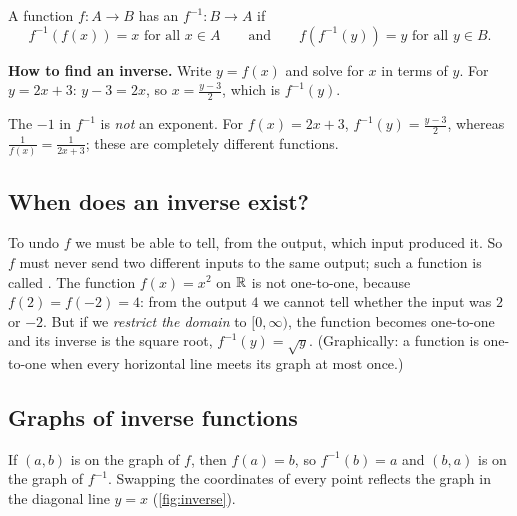 \begin{definition}\label{def:inverse-function}
A function $f\colon A \to B$ has an 
$f^{-1}\colon B \to A$ if
\[
  f^{-1}(f(x)) = x \text{ for all } x \in A
  \qquad\text{and}\qquad
  f(f^{-1}(y)) = y \text{ for all } y \in B .
\]
\end{definition}

\textbf{How to find an inverse.} Write $y = f(x)$ and solve for $x$ in terms of
$y$. For $y = 2x + 3$: $y - 3 = 2x$, so $x = \frac{y-3}{2}$, which is
$f^{-1}(y)$.

\begin{pitfall}[$f^{-1}$ is not $1/f$]
The $-1$ in $f^{-1}$ is \emph{not} an exponent. For $f(x) = 2x + 3$,
$f^{-1}(y) = \frac{y-3}{2}$, whereas $\frac{1}{f(x)} = \frac{1}{2x+3}$; these
are completely different functions.
\end{pitfall}

\subsection{When does an inverse exist?}

To undo $f$ we must be able to tell, from the output, which input produced
it. So $f$ must never send two different inputs to the same output; such a
function is called . The function $f(x) = x^2$ on $\mathbb{R}$ is not
one-to-one, because $f(2) = f(-2) = 4$: from the output $4$ we cannot tell
whether the input was $2$ or $-2$. But if we \emph{restrict the domain} to
$[0, \infty)$, the function becomes one-to-one and its inverse is the square
root, $f^{-1}(y) = \sqrt{y}$. (Graphically: a function is one-to-one when every
horizontal line meets its graph at most once.)

\subsection{Graphs of inverse functions}

If $(a, b)$ is on the graph of $f$, then $f(a) = b$, so $f^{-1}(b) = a$ and
$(b, a)$ is on the graph of $f^{-1}$. Swapping the coordinates of every point
reflects the graph in the diagonal line $y = x$ (\cref{fig:inverse}).

